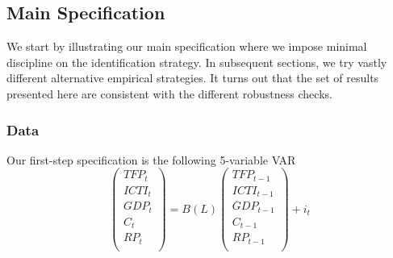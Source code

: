 \documentclass[12pt]{article}
\begin{document}
\subsection{Main Specification}\label{section:mainSpec}

We start by illustrating our main specification where we impose minimal discipline on the identification strategy. In subsequent sections, we try vastly different alternative empirical strategies. It turns out that the set of results presented here are consistent with the different robustness checks.

\subsubsection{Data}

Our first-step specification is the following 5-variable VAR 
\begin{equation}\label{eq:mainSpecification}
\begin{pmatrix}
TFP_t \\ 
ICTI_t \\
GDP_t \\
C_t \\
RP_t \\
\end{pmatrix} = B(L) \begin{pmatrix}
TFP_{t-1} \\ 
ICTI_{t-1} \\
GDP_{t-1} \\
C_{t-1} \\
RP_{t-1} \\
\end{pmatrix} + i_t
\end{equation}
\end{document}
